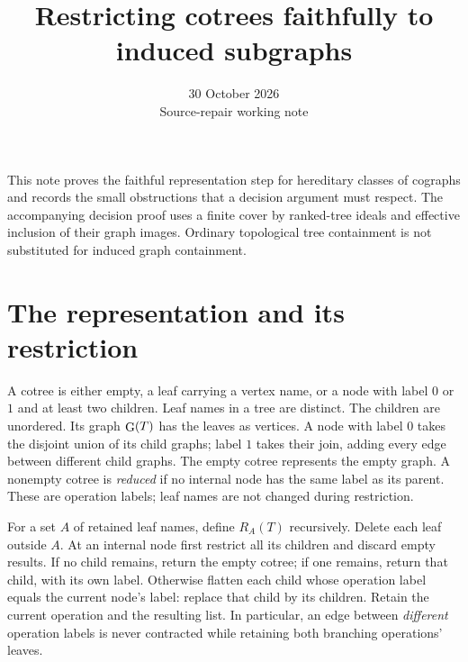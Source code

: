 \documentclass[11pt]{article}
\title{Restricting cotrees faithfully to induced subgraphs}
\author{}
\date{30 October 2026\\Source-repair working note}
\newcommand{\ev}{\mathop{\rm G}}
\begin{document}
\maketitle

This note proves the faithful representation step for hereditary classes of
cographs and records the small obstructions that a decision argument must
respect. The accompanying decision proof uses a finite cover by ranked-tree
ideals and effective inclusion of their graph images. Ordinary topological
tree containment is not substituted for induced graph containment.

\section{The representation and its restriction}
A cotree is either empty, a leaf carrying a vertex name, or a node with label
$0$ or $1$ and at least two children. Leaf names in a tree are distinct.
The children are unordered. Its graph $\ev(T)$ has the leaves as vertices.
A node with label $0$ takes the disjoint union of its child graphs; label $1$
takes their join, adding every edge between different child graphs. The empty
cotree represents the empty graph. A nonempty cotree is \emph{reduced} if no
internal node has the same label as its parent. These are operation labels;
leaf names are not changed during restriction.

For a set $A$ of retained leaf names, define $R_A(T)$ recursively. Delete each
leaf outside $A$. At an internal node first restrict all its children and
discard empty results. If no child remains, return the empty cotree; if one
remains, return that child, with its own label. Otherwise flatten each child
whose operation label equals the current node's label: replace that child by
its children. Retain the current operation and the resulting list. In
particular, an edge between \emph{different} operation labels is never
contracted while retaining both branching operations' leaves.
\end{document}
